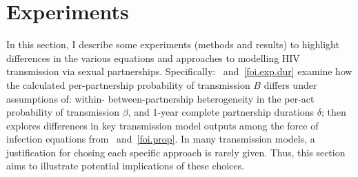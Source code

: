 \section{Experiments}\label{foi.exp}
In this section, I describe some experiments (methods and results) to
highlight differences in the various equations and approaches
to modelling HIV transmission via sexual partnerships.
Specifically:
~and~\ref{foi.exp.dur} examine how
the calculated per-partnership probability of transmission $B$ differs under assumptions of:
within- \vs between-partnership heterogeneity in the per-act probability of transmission $\beta$,
and 1-year \vs complete partnership durations $\delta$; then
 explores differences in key transmission model outputs
among the force of infection equations from ~and~\ref{foi.prop}.
In many transmission models,
a justification for chosing each specific approach is rarely given.
Thus, this section aims to illustrate potential implications of these choices.
